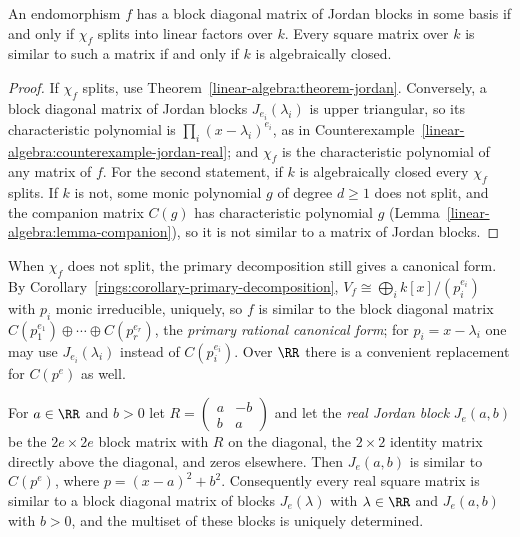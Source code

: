 \begin{proposition}\label{linear-algebra:proposition-jordan-exists}
An endomorphism $f$ has a block diagonal matrix of Jordan blocks in some basis if and only if
$\chi_f$ splits into linear factors over $k$. Every square matrix over $k$ is similar to such a
matrix if and only if $k$ is algebraically closed.
\end{proposition}

\begin{proof}
If $\chi_f$ splits, use Theorem~\ref{linear-algebra:theorem-jordan}. Conversely, a block diagonal
matrix of Jordan blocks $J_{e_i}(\lambda_i)$ is upper triangular, so its characteristic polynomial
is $\prod_i(x - \lambda_i)^{e_i}$, as in Counterexample~\ref{linear-algebra:counterexample-jordan-real}; and
$\chi_f$ is the characteristic polynomial of any matrix of $f$. For the second statement, if $k$
is algebraically closed every $\chi_f$ splits. If $k$ is not, some monic polynomial $g$ of degree
$d \geq 1$ does not split, and the companion matrix $C(g)$ has characteristic polynomial $g$
(Lemma~\ref{linear-algebra:lemma-companion}), so it is not similar to a matrix of Jordan blocks.
\end{proof}

When $\chi_f$ does not split, the primary decomposition still gives a canonical form. By
Corollary~\ref{rings:corollary-primary-decomposition}, $V_f \cong \bigoplus_ik[x]/(p_i^{e_i})$ with $p_i$
monic irreducible, uniquely, so $f$ is similar to the block diagonal matrix
$C(p_1^{e_1}) \oplus \cdots \oplus C(p_r^{e_r})$, the \emph{primary rational canonical form}; for
$p_i = x - \lambda_i$ one may use $J_{e_i}(\lambda_i)$ instead of $C(p_i^{e_i})$. Over $\RR$ there is a
convenient replacement for $C(p^e)$ as well.

\begin{proposition}\label{linear-algebra:proposition-real-jordan}
For $a \in \RR$ and $b > 0$ let $R = \begin{pmatrix} a & -b \\ b & a \end{pmatrix}$ and let the
\emph{real Jordan block} $J_e(a, b)$ be the $2e \times 2e$ block matrix with $R$ on the diagonal, the
$2 \times 2$ identity matrix directly above the diagonal, and zeros elsewhere. Then $J_e(a, b)$ is
similar to $C(p^e)$, where $p = (x - a)^2 + b^2$. Consequently every real square matrix is similar
to a block diagonal matrix of blocks $J_e(\lambda)$ with $\lambda \in \RR$ and $J_e(a, b)$ with
$b > 0$, and the multiset of these blocks is uniquely determined.
\end{proposition}

